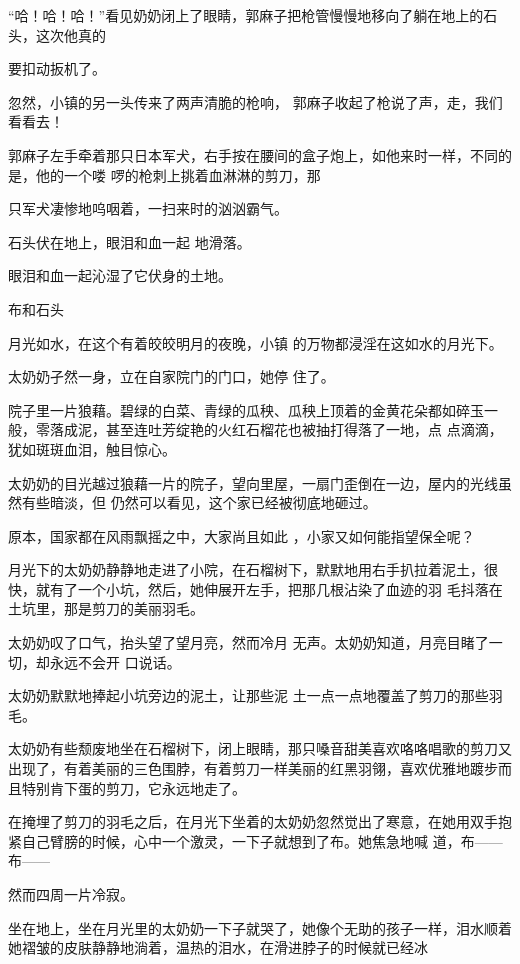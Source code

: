 \documentclass{article}
\begin{document}
“哈！哈！哈！”看见奶奶闭上了眼睛，郭麻子把枪管慢慢地移向了躺在地上的石头，这次他真的
\newpage

要扣动扳机了。 

忽然，小镇的另一头传来了两声清脆的枪响，
郭麻子收起了枪说了声，走，我们看看去！ 

郭麻子左手牵着那只日本军犬，右手按在腰间的盒子炮上，如他来时一样，不同的是，他的一个喽
啰的枪刺上挑着血淋淋的剪刀，那 

只军犬凄惨地呜咽着，一扫来时的汹汹霸气。
 


石头伏在地上，眼泪和血一起 地滑落。 


眼泪和血一起沁湿了它伏身的土地。 


布和石头 

月光如水，在这个有着皎皎明月的夜晚，小镇
的万物都浸淫在这如水的月光下。 

\newpage

太奶奶孑然一身，立在自家院门的门口，她停
住了。 

院子里一片狼藉。碧绿的白菜、青绿的瓜秧、瓜秧上顶着的金黄花朵都如碎玉一般，零落成泥，甚至连吐芳绽艳的火红石榴花也被抽打得落了一地，点
点滴滴，犹如斑斑血泪，触目惊心。 

太奶奶的目光越过狼藉一片的院子，望向里屋，一扇门歪倒在一边，屋内的光线虽然有些暗淡，但
仍然可以看见，这个家已经被彻底地砸过。 

原本，国家都在风雨飘摇之中，大家尚且如此
，小家又如何能指望保全呢？ 

月光下的太奶奶静静地走进了小院，在石榴树下，默默地用右手扒拉着泥土，很快，就有了一个小坑，然后，她伸展开左手，把那几根沾染了血迹的羽
毛抖落在土坑里，那是剪刀的美丽羽毛。 

太奶奶叹了口气，抬头望了望月亮，然而冷月
\newpage
无声。太奶奶知道，月亮目睹了一切，却永远不会开
口说话。 

太奶奶默默地捧起小坑旁边的泥土，让那些泥
土一点一点地覆盖了剪刀的那些羽毛。 

太奶奶有些颓废地坐在石榴树下，闭上眼睛，那只嗓音甜美喜欢咯咯唱歌的剪刀又出现了，有着美丽的三色围脖，有着剪刀一样美丽的红黑羽翎，喜欢优雅地踱步而且特别肯下蛋的剪刀，它永远地走了。

在掩埋了剪刀的羽毛之后，在月光下坐着的太奶奶忽然觉出了寒意，在她用双手抱紧自己臂膀的时候，心中一个激灵，一下子就想到了布。她焦急地喊
道，布——布—— 


然而四周一片冷寂。 

坐在地上，坐在月光里的太奶奶一下子就哭了，她像个无助的孩子一样，泪水顺着她褶皱的皮肤静静地淌着，温热的泪水，在滑进脖子的时候就已经冰
\newpage
\end{document}
